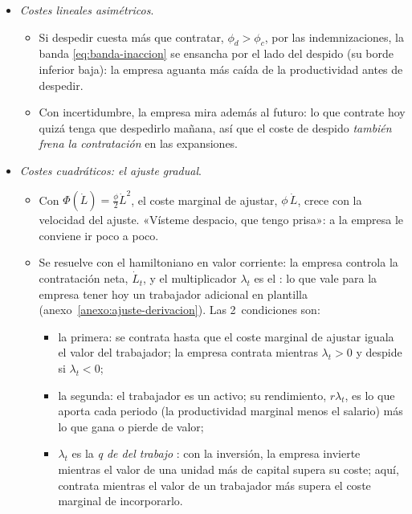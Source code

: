 \documentclass[11pt]{article}
\begin{document}
\begin{itemize}
\item \emph{Costes lineales asimétricos}\nocite{BentolilaBertola1990Firing}.
  \begin{itemize}
  \item Si despedir cuesta más que contratar, $\phi_d>\phi_c$, por las indemnizaciones, la banda \eqref{eq:banda-inaccion} se ensancha por el lado del despido (su borde inferior baja): la empresa aguanta más caída de la productividad antes de despedir.
  \item Con incertidumbre, la empresa mira además al futuro: lo que contrate hoy quizá tenga que despedirlo mañana, así que el coste de despido \emph{también frena la contratación} en las expansiones.
  \end{itemize}

\item \emph{Costes cuadráticos: el ajuste gradual}.
  \begin{itemize}
  \item Con $\Phi(\dot L)=\tfrac{\phi}{2}\dot L^{2}$, el coste marginal de ajustar, $\phi\,\dot L$, crece con la velocidad del ajuste. «Vísteme despacio, que tengo prisa»: a la empresa le conviene ir poco a poco.
  \item Se resuelve con el hamiltoniano en valor corriente: la empresa controla la contratación neta, $\dot L_t$, y el multiplicador $\lambda_t$ es el : lo que vale para la empresa tener hoy un trabajador adicional en plantilla  (anexo~\ref{anexo:ajuste-derivacion}). Las 2~condiciones son:
    \begin{itemize}
    \item la primera: se contrata hasta que el coste marginal de ajustar iguala el valor del trabajador; la empresa contrata mientras $\lambda_t>0$ y despide si $\lambda_t<0$;
    \item la segunda: el trabajador es un activo; su rendimiento, $r\lambda_t$, es lo que aporta cada periodo (la productividad marginal menos el salario) más lo que gana o pierde de valor;
    \item $\lambda_t$ es la \emph{q de  del trabajo} : con la inversión, la empresa invierte mientras el valor de una unidad más de capital supera su coste; aquí, contrata mientras el valor de un trabajador más supera el coste marginal de incorporarlo.
    \end{itemize}

\end{itemize}
\end{itemize}
\end{document}
